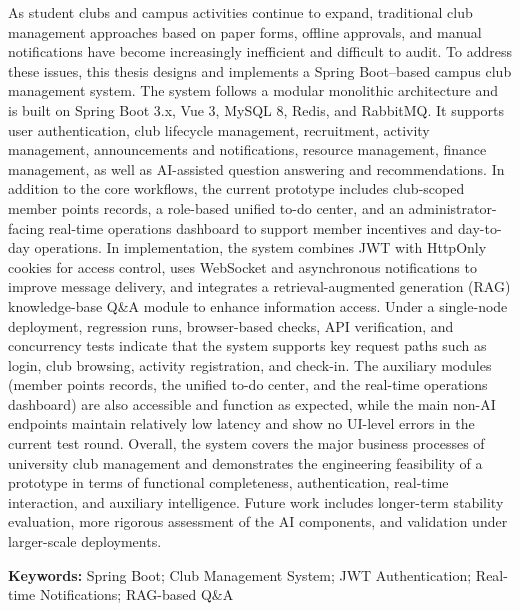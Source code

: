 As student clubs and campus activities continue to expand, 
traditional club management approaches based on paper forms,
offline approvals, and manual notifications have become increasingly 
inefficient and difficult to audit. To address these issues, 
this thesis designs and implements a Spring Boot--based campus club 
management system. The system follows a modular monolithic architecture 
and is built on Spring Boot 3.x, Vue 3, MySQL 8, Redis, and RabbitMQ. 
It supports user authentication, club lifecycle management, recruitment, 
activity management, announcements and notifications, resource management,
finance management, as well as AI-assisted question answering and 
recommendations. In addition to the core workflows, 
the current prototype includes club-scoped member points records, 
a role-based unified to-do center, and an administrator-facing real-time 
operations dashboard to support member incentives and day-to-day operations.
In implementation, the system combines JWT with HttpOnly cookies for 
access control, uses WebSocket and asynchronous notifications to improve 
message delivery, and integrates a retrieval-augmented generation (RAG) knowledge-base Q\&A module to enhance information access. Under a single-node deployment, regression runs, browser-based checks, API verification, and concurrency tests indicate that the system supports key request paths such as login, club browsing, activity registration, and check-in. The auxiliary modules (member points records, the unified to-do center, and the real-time operations dashboard) are also accessible and function as expected, while the main non-AI endpoints maintain relatively low latency and show no UI-level errors in the current test round.
Overall, the system covers the major business processes of university 
club management and demonstrates the engineering feasibility of 
a prototype in terms of functional completeness, authentication, 
real-time interaction, and auxiliary intelligence. 
Future work includes longer-term stability evaluation, 
more rigorous assessment of the AI components, 
and validation under larger-scale deployments.

\vspace{1em}
\noindent\textbf{Keywords:} Spring Boot; Club Management System; JWT Authentication; Real-time Notifications; RAG-based Q\&A

\newpage

